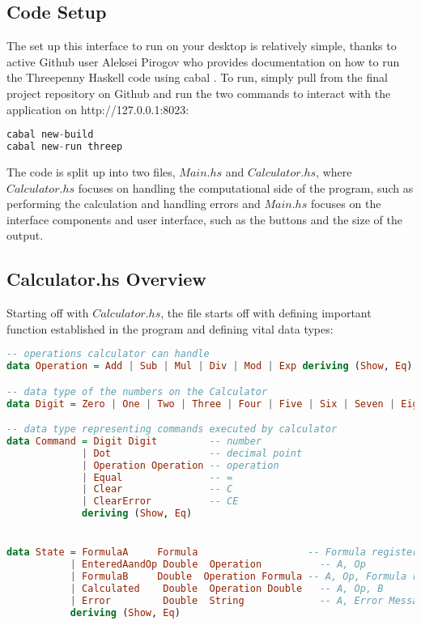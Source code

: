\documentclass{article}
\begin{document}
\subsection{Code Setup}
The set up this interface to run on your desktop is relatively simple, thanks to active Github user Aleksei Pirogov who provides documentation on how to run the Threepenny Haskell code using cabal \cite{ThreepennyCalc}. To run, simply pull from the final project repository on Github \cite{FinalProjectRepo} and run the two commands to interact with the application on http://127.0.0.1:8023:

\begin{lstlisting}[language=Haskell] 
cabal new-build
cabal new-run threep
\end{lstlisting}

\medskip\noindent
The code is split up into two files, $Main.hs$ and $Calculator.hs$, where $Calculator.hs$ focuses on handling the computational side of the program, such as performing the calculation and handling errors and $Main.hs$ focuses on the interface components and user interface, such as the buttons and the size of the output.

\subsection{Calculator.hs Overview}

Starting off with $Calculator.hs$, the file starts off with defining important function established in the program and defining vital data types:

\begin{lstlisting}[language=Haskell]
-- operations calculator can handle
data Operation = Add | Sub | Mul | Div | Mod | Exp deriving (Show, Eq)

-- data type of the numbers on the Calculator
data Digit = Zero | One | Two | Three | Four | Five | Six | Seven | Eight | Nine deriving (Show, Eq)

-- data type representing commands executed by calculator
data Command = Digit Digit         -- number
             | Dot                 -- decimal point
             | Operation Operation -- operation
             | Equal               -- =
             | Clear               -- C
             | ClearError          -- CE
             deriving (Show, Eq)


data State = FormulaA     Formula                   -- Formula register A
           | EnteredAandOp Double  Operation          -- A, Op
           | FormulaB     Double  Operation Formula -- A, Op, Formula register B
           | Calculated    Double  Operation Double   -- A, Op, B
           | Error         Double  String             -- A, Error Message
           deriving (Show, Eq)

\end{lstlisting}
\end{document}
